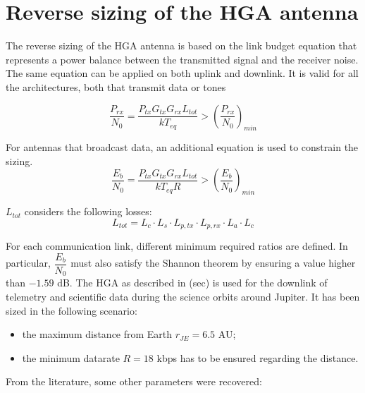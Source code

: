 \section{Reverse sizing of the HGA antenna}
\label{sec:HGA_sizing}

The reverse sizing of the HGA antenna is based on the link budget equation that represents a power balance between the transmitted signal and the receiver noise. The same equation can be applied on both uplink and downlink. It is valid for all the architectures, both that transmit data or tones

\begin{equation}
    \dfrac{P_{rx}}{N_0} = \dfrac{P_{tx} G_{tx} G_{rx} L_{tot}}{k T_{eq}} > \left( \dfrac{P_{rx}}{N_0} \right)_{min}
\end{equation}

For antennas that broadcast data, an additional equation is used to constrain the sizing.
\begin{equation}
    \dfrac{E_b}{N_0} = \dfrac{P_{tx} G_{tx} G_{rx} L_{tot}}{k T_{eq} R} > \left( \dfrac{E_b}{N_0} \right)_{min}
\end{equation}

$L_{tot}$ considers the following losses:
\begin{equation}
    L_{tot} = L_{c} \cdot L_{s} \cdot L_{p,tx} \cdot L_{p,rx} \cdot L_{a} \cdot L_{c}
\end{equation}

For each communication link, different minimum required ratios are defined. In particular, $\dfrac{E_b}{N_0}$ must also satisfy the Shannon theorem by ensuring a value higher than $-1.59$ dB. 
The HGA as described in (sec) is used for the downlink of telemetry and scientific data during the science orbits around Jupiter. It has been sized in the following scenario: 
\begin{itemize}
    \item the maximum distance from Earth $r_{JE} = 6.5$ AU;
    \item the minimum datarate $R = 18$ kbps has to be ensured regarding the distance.
\end{itemize}

From the literature, some other parameters were recovered: 

